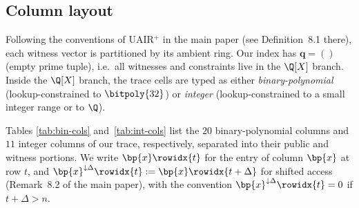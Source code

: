\subsection{Column layout}\label{sec:cols}

Following the conventions of UAIR$^+$ in the main paper (see
Definition~8.1 there), each witness vector is partitioned by its
ambient ring. Our index has $\mathbf{q} = ()$ (empty prime tuple),
i.e.\ all witnesses and constraints live in the $\Q[X]$ branch.
Inside the $\Q[X]$ branch, the trace cells are typed as either
\emph{binary-polynomial} (lookup-constrained to $\bitpoly{32}$) or
\emph{integer} (lookup-constrained to a small integer range or to
$\Q$).

Tables \ref{tab:bin-cols} and~\ref{tab:int-cols} list the $20$
binary-polynomial columns and $11$ integer columns of our trace,
respectively, separated into their public and witness portions. We
write $\bp{x}\rowidx{t}$ for the entry of column $\bp{x}$ at row $t$,
and $\bp{x}^{\downarrow\Delta}\rowidx{t} := \bp{x}\rowidx{t+\Delta}$
for shifted access (Remark~8.2 of the main paper), with the convention
$\bp{x}^{\downarrow\Delta}\rowidx{t} = 0$ if $t+\Delta > n$.

